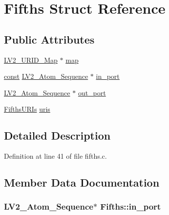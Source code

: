 \hypertarget{struct_fifths}{}\section{Fifths Struct Reference}
\label{struct_fifths}
\subsection*{Public Attributes}
\begin{DoxyCompactItemize}
\item 
\hyperlink{urid_8h_afefb42cd271f750506a8739f73c098c5}{L\+V2\+\_\+\+U\+R\+I\+D\+\_\+\+Map} $\ast$ \hyperlink{struct_fifths_abcd05d6db9f1cd97b5f1fe851c600a0b}{map}
\item 
\hyperlink{getopt1_8c_a2c212835823e3c54a8ab6d95c652660e}{const} \hyperlink{struct_l_v2___atom___sequence}{L\+V2\+\_\+\+Atom\+\_\+\+Sequence} $\ast$ \hyperlink{struct_fifths_a37facc63d7e357f248c6bbf0af7069ad}{in\+\_\+port}
\item 
\hyperlink{struct_l_v2___atom___sequence}{L\+V2\+\_\+\+Atom\+\_\+\+Sequence} $\ast$ \hyperlink{struct_fifths_a10d7dec668d3efc5b6d396b5f1161c26}{out\+\_\+port}
\item 
\hyperlink{struct_fifths_u_r_is}{Fifths\+U\+R\+Is} \hyperlink{struct_fifths_a25f2db18a39f50822cd2f95b428650c8}{uris}
\end{DoxyCompactItemize}


\subsection{Detailed Description}


Definition at line 41 of file fifths.\+c.



\subsection{Member Data Documentation}
\subsubsection[{\texorpdfstring{in\+\_\+port}{in_port}}]{ {\bf L\+V2\+\_\+\+Atom\+\_\+\+Sequence}$\ast$ Fifths\+::in\+\_\+port}\hypertarget{struct_fifths_a37facc63d7e357f248c6bbf0af7069ad}{}\label{struct_fifths_a37facc63d7e357f248c6bbf0af7069ad}


